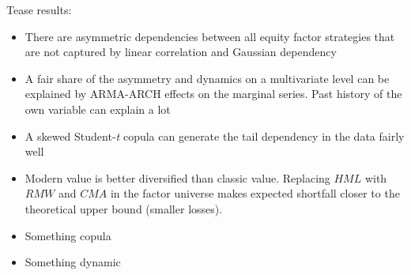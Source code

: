 Tease results:
\begin{itemize}
	\item There are asymmetric dependencies between all equity factor strategies that are not captured by linear correlation and Gaussian dependency
	\item A fair share of the asymmetry and dynamics on a multivariate level can be explained by ARMA-ARCH effects on the marginal series. Past history of the own variable can explain a lot
	\item A skewed Student-\textit{t} copula can generate the tail dependency in the data fairly well
	\item Modern value is better diversified than classic value. Replacing $HML$ with $RMW$ and $CMA$ in the factor universe makes expected shortfall closer to the theoretical upper bound (smaller losses).
	\item Something copula
	\item Something dynamic
\end{itemize}	

